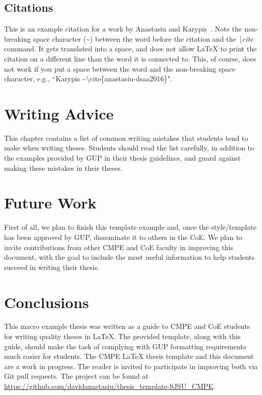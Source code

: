 \subsection{Citations}\label{sec:latex:citations}
This is an example citation for a work by Anastasiu and Karypis~\cite{anastasiu-dsaa2016}. Note the non-breaking space character (\textasciitilde) between the word before the citation and the \textit{{\textbackslash}cite} command. It gets translated into a space, and does not allow LaTeX to print the citation on a different line than the word it is connected to. This, of course, does not work if you put a space between the word and the non-breaking space character, e.g., ``Karypis \textasciitilde{\textbackslash}cite\{anastasiu-dsaa2016\}".


\section{Writing Advice}\label{sec:writing}

This chapter contains a list of common writing mistakes that students tend to make when writing theses. Students should read the list carefully, in addition to the examples provided by GUP in their thesis guidelines, and guard against making these mistakes in their theses.


\section{Future Work}\label{sec:future_work}

First of all, we plan to finish this template example and, once the style/template has been approved by GUP, disseminate it to others in the CoE. We plan to invite contributions from other CMPE and CoE faculty in improving this document, with the goal to include the most useful information to help students succeed in writing their thesis.


\section{Conclusions}\label{sec:conclusions}
This macro example thesis was written as a guide to CMPE and CoE students for writing quality theses in LaTeX. The provided template, along with this guide, should make the task of complying with GUP formatting requirements much easier for students. The CMPE LaTeX thesis template and this document are a work in progress. The reader is invited to participate in improving both via Git pull requests. The project can be found at \url{https://github.com/davidanastasiu/thesis_template-SJSU_CMPE}.

